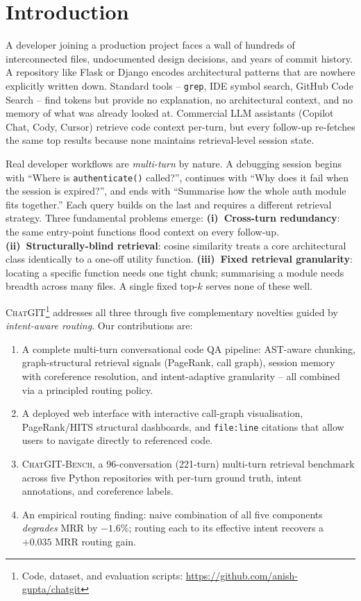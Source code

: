 \documentclass[conference]{IEEEtran}
\newcommand{\chatgit}{\textsc{ChatGIT}\xspace}
\newcommand{\conv}{\textsc{ChatGIT-Bench}\xspace}
\begin{document}
\section{Introduction}

A developer joining a production project faces a wall of hundreds of
interconnected files, undocumented design decisions, and years of commit
history. A repository like Flask or Django encodes architectural patterns
that are nowhere explicitly written down. Standard tools -- \texttt{grep},
IDE symbol search, GitHub Code Search -- find tokens but provide no
explanation, no architectural context, and no memory of what was already
looked at. Commercial LLM assistants (Copilot Chat, Cody, Cursor) retrieve
code context per-turn, but every follow-up re-fetches the same top results
because none maintains retrieval-level session state.

Real developer workflows are \emph{multi-turn} by nature. A debugging
session begins with ``Where is \texttt{authenticate()} called?'', continues
with ``Why does it fail when the session is expired?'', and ends with
``Summarise how the whole auth module fits together.'' Each query builds on
the last and requires a different retrieval strategy. Three fundamental
problems emerge:
\textbf{(i)~Cross-turn redundancy}: the same entry-point functions flood
context on every follow-up.
\textbf{(ii)~Structurally-blind retrieval}: cosine similarity treats a
core architectural class identically to a one-off utility function.
\textbf{(iii)~Fixed retrieval granularity}: locating a specific function
needs one tight chunk; summarising a module needs breadth across many files.
A single fixed top-$k$ serves none of these well.

\chatgit\footnote{Code, dataset, and evaluation scripts:
\url{https://github.com/anish-gupta/chatgit}} addresses all three through
five complementary novelties guided by \emph{intent-aware routing}.
Our contributions are:
\begin{enumerate}
  \item A complete multi-turn conversational code QA pipeline: AST-aware
        chunking, graph-structural retrieval signals (PageRank, call graph),
        session memory with coreference resolution, and intent-adaptive
        granularity -- all combined via a principled routing policy.
  \item A deployed web interface with interactive call-graph visualisation,
        PageRank/HITS structural dashboards, and \texttt{file:line}
        citations that allow users to navigate directly to referenced code.
  \item \conv, a 96-conversation (221-turn) multi-turn retrieval benchmark
        across five Python repositories with per-turn ground truth,
        intent annotations, and coreference labels.
  \item An empirical routing finding: naive combination of all five
        components \emph{degrades} MRR by $-1.6\%$; routing each to its
        effective intent recovers a $+0.035$ MRR routing gain.
\end{enumerate}
\end{document}
